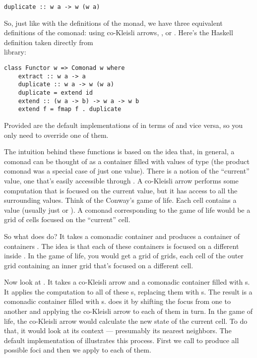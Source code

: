 \begin{verbatim}
duplicate :: w a -> w (w a)
\end{verbatim}
So, just like with the definitions of the monad, we have three
equivalent definitions of the comonad: using co-Kleisli arrows,
, or . Here's the Haskell definition
taken directly from\\  library:

\begin{verbatim}
class Functor w => Comonad w where
    extract :: w a -> a
    duplicate :: w a -> w (w a)
    duplicate = extend id
    extend :: (w a -> b) -> w a -> w b
    extend f = fmap f . duplicate
\end{verbatim}
Provided are the default implementations of  in terms of
 and vice versa, so you only need to override one of
them.

The intuition behind these functions is based on the idea that, in
general, a comonad can be thought of as a container filled with values
of type  (the product comonad was a special case of just one
value). There is a notion of the ``current'' value, one that's easily
accessible through . A co-Kleisli arrow performs some
computation that is focused on the current value, but it has access to
all the surrounding values. Think of the Conway's game of life. Each
cell contains a value (usually just  or ). A
comonad corresponding to the game of life would be a grid of cells
focused on the ``current'' cell.

So what does  do? It takes a comonadic container
 and produces a container of containers .
The idea is that each of these containers is focused on a different
 inside . In the game of life, you would get a
grid of grids, each cell of the outer grid containing an inner grid
that's focused on a different cell.

Now look at . It takes a co-Kleisli arrow and a comonadic
container  filled with s. It applies the
computation to all of these s, replacing them with
s. The result is a comonadic container filled with
s.  does it by shifting the focus from one
 to another and applying the co-Kleisli arrow to each of them
in turn. In the game of life, the co-Kleisli arrow would calculate the
new state of the current cell. To do that, it would look at its context
--- presumably its nearest neighbors. The default implementation of
 illustrates this process. First we call
 to produce all possible foci and then we apply
 to each of them.

